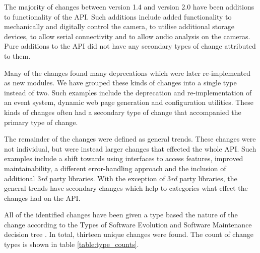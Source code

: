 \documentclass{sig-alternate}
\begin{document}
The majority of changes between version 1.4 and version 2.0 have been additions to functionality of the API. Such additions include added functionality to mechanically and digitally control the camera, to utilise additional storage devices, to allow serial connectivity and to allow audio analysis on the cameras. Pure additions to the API did not have any secondary types of change attributed to them.

Many of the changes found many deprecations which were later re-implemented as new modules. We have grouped these kinds of changes into a single type instead of two. Such examples include the deprecation and re-implementation of an event system, dynamic web page generation and configuration utilities. These kinds of changes often had a secondary type of change that accompanied the primary type of change.

The remainder of the changes were defined as general trends. These changes were not individual, but were instead larger changes that effected the whole API. Such examples include a shift towards using interfaces to access features, improved maintainability, a different error-handling approach and the inclusion of additional 3\textit{rd} party libraries. With the exception of 3\textit{rd} party libraries, the general trends have secondary changes which help to categories what effect the changes had on the API.

All of the identified changes have been given a type based the nature of the change according to the Types of Software Evolution and Software Maintenance decision tree \cite{chapin2001types}. In total, thirteen unique changes were found. The count of change types is shown in table \ref{table:type_counts}.
\end{document}

